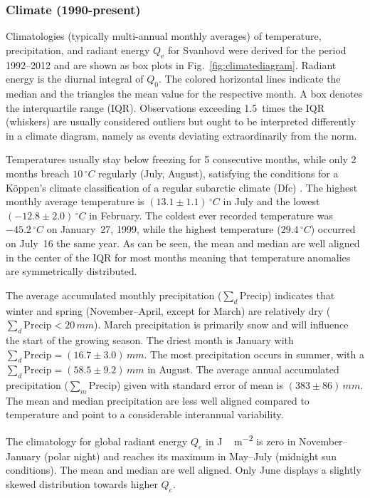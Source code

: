 \documentclass[bg, manuscript]{copernicus}
\begin{document}
\subsubsection{Climate (1990-present)}
\label{subsec:climatologies}

Climatologies (typically multi-annual monthly averages) of temperature, precipitation, and radiant energy $Q_\mathrm{e}$ for Svanhovd were derived for the period 1992--2012 and are shown as box plots in Fig.~\ref{fig:climatediagram}. Radiant energy is the diurnal integral of $Q_0$. The colored horizontal lines indicate the median and the triangles the mean value for the respective month. A box denotes the interquartile range (IQR). Observations exceeding 1.5~times the IQR (whiskers) are usually considered outliers but ought to be interpreted differently in a climate diagram, namely as events deviating extraordinarily from the norm.

Temperatures usually stay below freezing for 5 consecutive months, while only 2 months breach $10\,\unit{^\circ C}$ regularly (July, August), satisfying the conditions for a K\"{o}ppen's climate classification of a regular subarctic climate (Dfc) \citep[e.g.][]{SD:Beck2018}. The highest monthly average temperature is $(13.1\pm 1.1)\,\unit{^\circ C}$ in July and the lowest $(-12.8\pm 2.0)\,\unit{^\circ C}$ in February. The coldest ever recorded temperature was $-45.2\,\unit{^\circ C}$ on January~27, 1999, while the highest temperature ($29.4\,\unit{^\circ C}$) occurred on July~16 the same year. As can be seen, the mean and median are well aligned in the center of the IQR for most months meaning that temperature anomalies are symmetrically distributed.

The average accumulated monthly precipitation ($\sum_d\mathrm{Precip}$) indicates that winter and spring (November--April, except for March) are relatively dry ($\sum_d\mathrm{Precip} < 20\,\unit{mm}$). March precipitation is primarily snow and will influence the start of the growing season. The driest month is January with $\sum_d\mathrm{Precip} = (16.7\pm 3.0)\,\unit{mm}$. The most precipitation occurs in summer, with a $\sum_d\mathrm{Precip} = (58.5\pm 9.2)\,\unit{mm}$ in August. The average annual accumulated precipitation ($\sum_m\mathrm{Precip}$) given with standard error of mean is $(383\pm 86)\,\unit{mm}$. The mean and median precipitation are less well aligned compared to temperature and point to a considerable interannual variability.

The climatology for global radiant energy $Q_e$ in \unit{J\,m^{-2}} is zero in November--January (polar night) and reaches its maximum in May--July (midnight sun conditions). The mean and median are well aligned. Only June displays a slightly skewed distribution towards higher $Q_e$.
\end{document}
